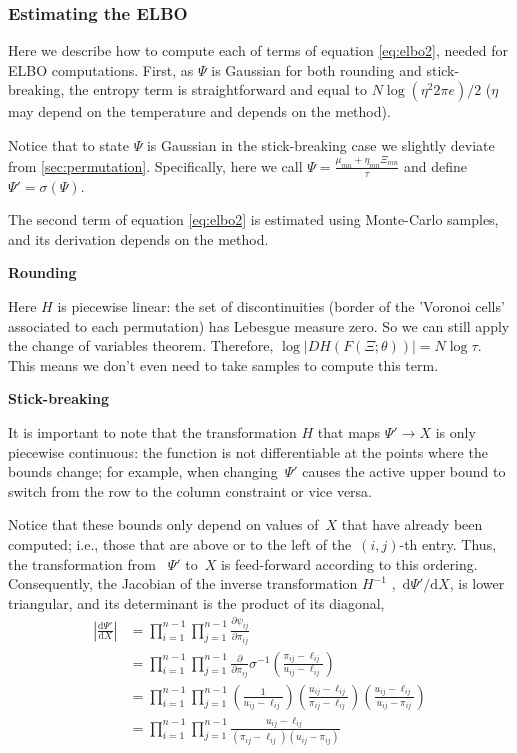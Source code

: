 \documentclass[twoside]{article}
\begin{document}
\subsubsection*{Estimating the ELBO} 
Here we describe how to compute each of terms of equation \eqref{eq:elbo2}, needed for ELBO computations. First, as $\Psi$ is Gaussian for both rounding and stick-breaking, the entropy term is straightforward and equal to $N\log(\eta^2 2\pi e )/2$ ($\eta$ may depend on the temperature and depends on the method). 

Notice that to state $\Psi$ is Gaussian in the stick-breaking case we slightly deviate from \ref{sec:permutation}. Specifically, here we call $\Psi=\frac{\mu_{mn} + \eta_{mn} \Xi_{mn}}{\tau} $ and define $\Psi' = \sigma(\Psi)$.

The second term of equation \eqref{eq:elbo2} is estimated using Monte-Carlo samples, and its derivation depends on the method. 

\textbf{Rounding}

Here $H$ is piecewise linear: the set of discontinuities (border of the 'Voronoi cells' associated to each permutation) has Lebesgue measure zero. So we can still apply the change of variables theorem. Therefore, 
$\log |DH(F(\Xi;\theta)) |= N\log
\tau$. This means we don't even need to take samples to compute this term.


\textbf{Stick-breaking}

It is important to note that the transformation $H$ that maps $\Psi'\rightarrow X$ is only piecewise
continuous: the function is not differentiable at the points where
the bounds change; for example, when changing~$\Psi'$ causes the
active upper bound to switch from the row to the column constraint
or vice versa.  

Notice that these bounds only depend on values of~$X$ that
have already been computed; i.e., those that are above or to the left of
the~$(i,j)$-th entry. Thus, the transformation from ~$\Psi'$ to~$X$
is feed-forward according to this ordering.  Consequently, the
Jacobian of the inverse transformation $H^{-1}$ ,~$\mathrm{d}\Psi' / \mathrm{d} X$,
is lower triangular, and its determinant is the product of its diagonal,
\begin{align}
\nonumber \left| \frac{\mathrm{d} \Psi'} {\mathrm{d} X} \right|
&= \prod_{i=1}^{n-1} \prod_{j=1}^{n-1} \frac{\partial \psi_{ij} }{\partial {\pi}_{ij}} \\
\nonumber &= \prod_{i=1}^{n-1} \prod_{j=1}^{n-1} \frac{\partial}{\partial {\pi}_{ij}}
\sigma^{-1} \left( \frac{{\pi}_{ij} - \ell_{ij}}{u_{ij} - \ell_{ij}} \right ) \\
\nonumber &= \prod_{i=1}^{n-1} \prod_{j=1}^{n-1}
\left( \frac{1}{u_{ij} - \ell_{ij}} \right )
\left( \frac{u_{ij} - \ell_{ij}}{{\pi}_{ij} - \ell_{ij}} \right )
\left( \frac{u_{ij} - \ell_{ij}}{u_{ij} - {\pi}_{ij}} \right ) \\
\nonumber &= \prod_{i=1}^{n-1} \prod_{j=1}^{n-1}
\frac{u_{ij} - \ell_{ij}}{({\pi}_{ij} - \ell_{ij}) (u_{ij} - {\pi}_{ij})}
\end{align}
\end{document}

